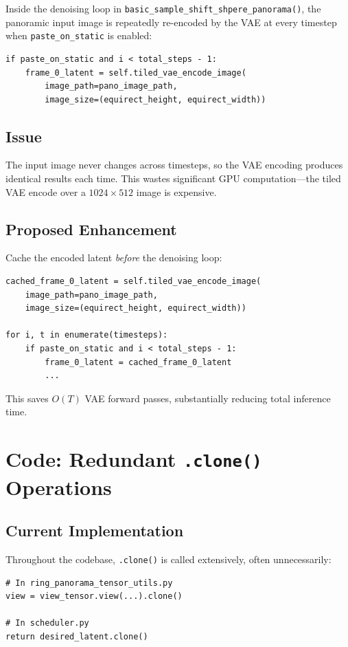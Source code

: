 \documentclass[11pt,a4paper]{article}
\newcommand{\fn}[1]{\texttt{#1}}
\begin{document}
Inside the denoising loop in \fn{basic\_sample\_shift\_shpere\_panorama()}, the panoramic input image is repeatedly re-encoded by the VAE at every timestep when \fn{paste\_on\_static} is enabled:
\begin{lstlisting}
if paste_on_static and i < total_steps - 1:
    frame_0_latent = self.tiled_vae_encode_image(
        image_path=pano_image_path,
        image_size=(equirect_height, equirect_width))
\end{lstlisting}

\subsection{Issue}

The input image never changes across timesteps, so the VAE encoding produces identical results each time.
This wastes significant GPU computation---the tiled VAE encode over a $1024\!\times\!512$ image is expensive.

\subsection{Proposed Enhancement}

Cache the encoded latent \emph{before} the denoising loop:
\begin{lstlisting}
cached_frame_0_latent = self.tiled_vae_encode_image(
    image_path=pano_image_path,
    image_size=(equirect_height, equirect_width))

for i, t in enumerate(timesteps):
    if paste_on_static and i < total_steps - 1:
        frame_0_latent = cached_frame_0_latent
        ...
\end{lstlisting}

This saves $O(T)$ VAE forward passes, substantially reducing total inference time.

\section{Code: Redundant \fn{.clone()} Operations}

\subsection{Current Implementation}

Throughout the codebase, \fn{.clone()} is called extensively, often unnecessarily:
\begin{lstlisting}
# In ring_panorama_tensor_utils.py
view = view_tensor.view(...).clone()

# In scheduler.py
return desired_latent.clone()
\end{lstlisting}
\end{document}
